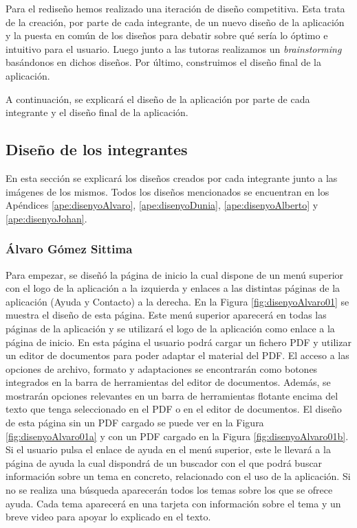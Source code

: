 Para el rediseño hemos realizado una iteración de diseño competitiva. Esta trata de la creación, por parte de cada integrante, de un nuevo diseño de la aplicación y la puesta en común de los diseños para debatir sobre qué sería lo óptimo e intuitivo para el usuario. Luego junto a las tutoras realizamos un \textit{brainstorming} basándonos en dichos diseños. Por último, construimos el diseño final de la aplicación.

A continuación, se explicará el diseño de la aplicación por parte de cada integrante y el diseño final de la aplicación.
\subsection{Diseño de los integrantes}
En esta sección se explicará los diseños creados por cada integrante junto a las imágenes de los mismos. Todos los diseños mencionados se encuentran en los Apéndices \ref{ape:disenyoAlvaro}, \ref{ape:disenyoDunia}, \ref{ape:disenyoAlberto} y \ref{ape:disenyoJohan}.

\subsubsection{Álvaro Gómez Sittima}
\label{sec:iterAlvaro}
Para empezar, se diseñó la página de inicio la cual dispone de un menú superior con el logo de la aplicación a la izquierda y enlaces a las distintas páginas de la aplicación (Ayuda y Contacto) a la derecha. En la Figura \ref{fig:disenyoAlvaro01} se muestra el diseño de esta página. Este menú superior aparecerá en todas las páginas de la aplicación y se utilizará el logo de la aplicación como enlace a la página de inicio. En esta página el usuario podrá cargar un fichero PDF y utilizar un editor de documentos para poder adaptar el material del PDF. El acceso a las opciones de archivo, formato y adaptaciones se encontrarán como botones integrados en la barra de herramientas del editor de documentos. Además, se mostrarán opciones relevantes en un barra de herramientas flotante encima del texto que tenga seleccionado en el PDF o en el editor de documentos. El diseño de esta página sin un PDF cargado se puede ver en la Figura \ref{fig:disenyoAlvaro01a} y con un PDF cargado en la Figura \ref{fig:disenyoAlvaro01b}. Si el usuario pulsa el enlace de ayuda en el menú superior, este le llevará a la página de ayuda la cual dispondrá de un buscador con el que podrá buscar información sobre un tema en concreto, relacionado con el uso de la aplicación. Si no se realiza una búsqueda aparecerán todos los temas sobre los que se ofrece ayuda. Cada tema aparecerá en una tarjeta con información sobre el tema y un breve video para apoyar lo explicado en el texto.

